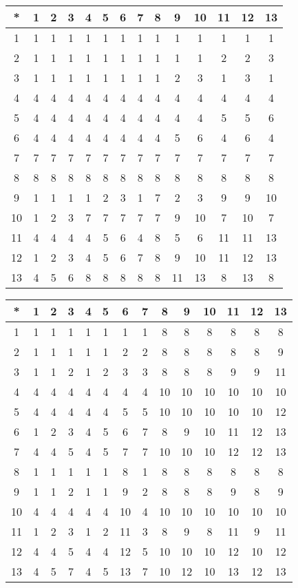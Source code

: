 \begin{tabular}[t]{c|ccccccccccccc}
*&1&2&3&4&5&6&7&8&9&10&11&12&13 \\ \hline
    1&1&1&1&1&1&1&1&1&1&1&1&1&1 \\
    2&1&1&1&1&1&1&1&1&1&1&2&2&3 \\
    3&1&1&1&1&1&1&1&1&2&3&1&3&1 \\
    4&4&4&4&4&4&4&4&4&4&4&4&4&4 \\
    5&4&4&4&4&4&4&4&4&4&4&5&5&6 \\
    6&4&4&4&4&4&4&4&4&5&6&4&6&4 \\
    7&7&7&7&7&7&7&7&7&7&7&7&7&7 \\
    8&8&8&8&8&8&8&8&8&8&8&8&8&8 \\
    9&1&1&1&1&2&3&1&7&2&3&9&9&10 \\
    10&1&2&3&7&7&7&7&7&9&10&7&10&7 \\
    11&4&4&4&4&5&6&4&8&5&6&11&11&13 \\
    12&1&2&3&4&5&6&7&8&9&10&11&12&13 \\
    13&4&5&6&8&8&8&8&8&11&13&8&13&8 
\end{tabular}


\begin{tabular}[t]{c|ccccccccccccc}
*&1&2&3&4&5&6&7&8&9&10&11&12&13 \\ \hline
    1&1&1&1&1&1&1&1&8&8&8&8&8&8 \\
    2&1&1&1&1&1&2&2&8&8&8&8&8&9 \\
    3&1&1&2&1&2&3&3&8&8&8&9&9&11 \\
    4&4&4&4&4&4&4&4&10&10&10&10&10&10 \\
    5&4&4&4&4&4&5&5&10&10&10&10&10&12 \\
    6&1&2&3&4&5&6&7&8&9&10&11&12&13 \\
    7&4&4&5&4&5&7&7&10&10&10&12&12&13 \\
    8&1&1&1&1&1&8&1&8&8&8&8&8&8 \\
    9&1&1&2&1&1&9&2&8&8&8&9&8&9 \\
    10&4&4&4&4&4&10&4&10&10&10&10&10&10 \\
    11&1&2&3&1&2&11&3&8&9&8&11&9&11 \\
    12&4&4&5&4&4&12&5&10&10&10&12&10&12 \\
    13&4&5&7&4&5&13&7&10&12&10&13&12&13 
\end{tabular}


